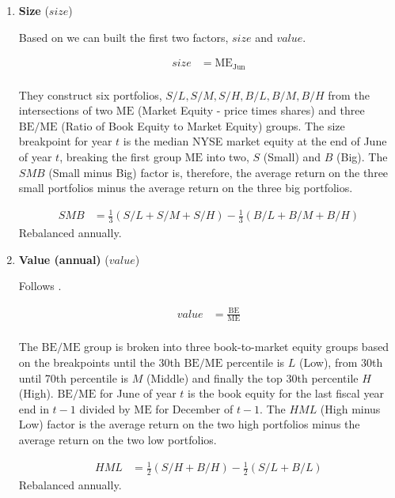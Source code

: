 \begin{enumerate}
	\item \textbf{Size} ($size$)
	
	Based on  we can built the first two factors, $size$ and $value$.
	
	\begin{align*}
		size &= \mathrm{ME}_{\text{Jun}} \\
	\end{align*}
	
	They construct six portfolios, $S/L, S/M, S/H, B/L, B/M, B/H$ from the intersections of two $\mathrm{ME}$ (Market Equity - price times shares) and three $\mathrm{BE}/\mathrm{ME}$ (Ratio of Book Equity to Market Equity) groups. The size breakpoint for year $t$ is the median NYSE market equity at the end of June of year $t$, breaking the first group $\mathrm{ME}$ into two, $S$ (Small) and $B$ (Big). The $SMB$ (Small minus Big) factor is, therefore, the average return on the three small portfolios minus the average return on the three big portfolios.
	
	\begin{align*}
		SMB &= \frac{1}{3}\left(S/L + S/M + S/H\right) - \frac{1}{3}\left(B/L + B/M + B/H\right)
	\end{align*}
	Rebalanced annually.


	
	\item \textbf{Value (annual)} ($value$)
	
	Follows . 
	
	\begin{align*}
		value &= \frac { \mathrm{BE} }{ \mathrm{ME} } \\
	\end{align*}

	 The $\mathrm{BE}/\mathrm{ME}$ group is broken into three book-to-market equity groups based on the breakpoints until the 30th $\mathrm{BE}/\mathrm{ME}$ percentile is $L$ (Low), from 30th until 70th percentile is $M$ (Middle) and finally the top 30th percentile $H$ (High). $\mathrm{BE}/\mathrm{ME}$ for June of year $t$ is the book equity for the last fiscal year end in $t-1$ divided by $\mathrm{ME}$ for December of $t-1$. The $HML$ (High minus Low) factor is the average return on the two high portfolios minus the average return on the two low portfolios. 
	
	\begin{align*}
		HML &= \frac{1}{2}\left(S/H + B/H\right) - \frac{1}{2}\left(S/L + B/L\right)
	\end{align*}
	Rebalanced annually.




\end{enumerate}
